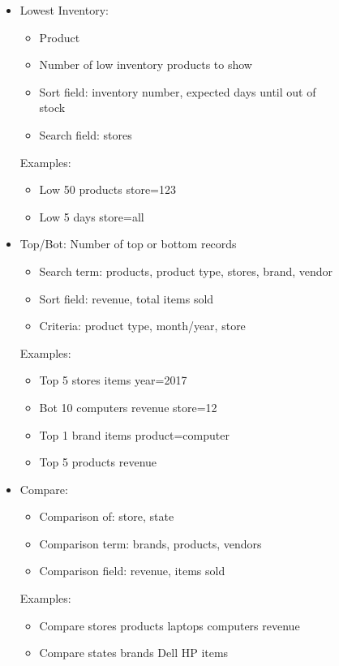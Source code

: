 \documentclass{article}
\begin{document}
\begin{figure}[H]
\begin{itemize}
        \pagebreak

      \item 
        Lowest Inventory:
        \begin{itemize}
          \item Product
          \item Number of low inventory products to show
          \item Sort field: inventory number, expected days until out of stock
          \item Search field: stores
        \end{itemize}
        Examples:
        \begin{itemize}
          \item Low 50 products store=123
          \item Low 5 days store=all
        \end{itemize}

      \item
        Top/Bot: Number of top or bottom records
        \begin{itemize}
          \item Search term: products, product type, stores, brand, vendor
          \item Sort field: revenue, total items sold
          \item Criteria: product type, month/year, store
        \end{itemize}
        Examples:
        \begin{itemize}
          \item Top 5 stores items year=2017
          \item Bot 10 computers revenue store=12
          \item Top 1 brand items product=computer
          \item Top 5 products revenue
        \end{itemize}

      \item
        Compare:
        \begin{itemize}
          \item Comparison of: store, state
          \item Comparison term: brands, products, vendors
          \item Comparison field: revenue, items sold
        \end{itemize}
        Examples:
        \begin{itemize}
          \item Compare stores products laptops computers revenue 
          \item Compare states brands Dell HP items
        \end{itemize}


\end{itemize}
\end{figure}
\end{document}

